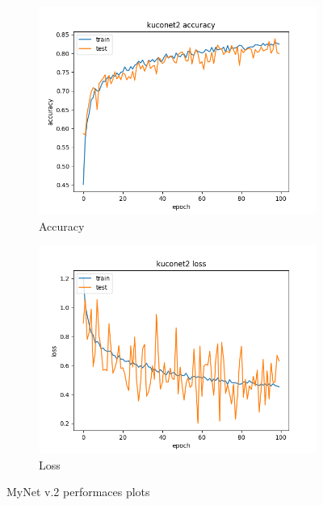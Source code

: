 \documentclass[11pt]{article}
\begin{document}
\begin{figure}[H]
	\centering
	\begin{subfigure}[b]{0.4\linewidth}
		\includegraphics[width=\linewidth]{../images/kuconet2_100_epochs_accuracy.png}
		\caption{Accuracy}
	\end{subfigure}
	\begin{subfigure}[b]{0.4\linewidth}
		\includegraphics[width=\linewidth]{../images/kuconet2_100_epochs_loss.png}
		\caption{Loss}
	\end{subfigure}
	\caption{MyNet v.2 performaces plots}
	\label{fig:mynet2performances}
\end{figure}
\end{document}
